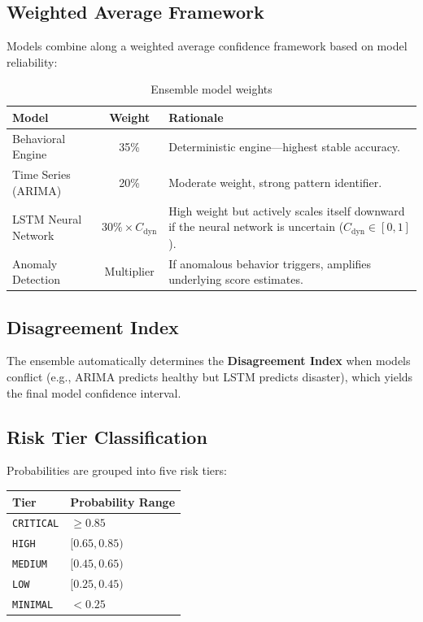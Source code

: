 \documentclass[12pt, a4paper, oneside]{report}
\begin{document}
\subsection{Weighted Average Framework}

Models combine along a weighted average confidence framework based on model reliability:

\begin{table}[H]
\centering
\caption{Ensemble model weights}
\label{tab:weights}
\begin{tabular}{@{} l c p{6.5cm} @{}}
\toprule
\textbf{Model} & \textbf{Weight} & \textbf{Rationale} \\
\midrule
Behavioral Engine     & 35\% & Deterministic engine---highest stable accuracy. \\[3pt]
Time Series (ARIMA)   & 20\% & Moderate weight, strong pattern identifier. \\[3pt]
LSTM Neural Network   & $30\% \times C_{\text{dyn}}$ & High weight but actively scales itself downward if the neural network is uncertain ($C_{\text{dyn}} \in [0,1]$). \\[3pt]
Anomaly Detection     & Multiplier & If anomalous behavior triggers, amplifies underlying score estimates. \\
\bottomrule
\end{tabular}
\end{table}

\subsection{Disagreement Index}

The ensemble automatically determines the \textbf{Disagreement Index} when models conflict (e.g., ARIMA predicts healthy but LSTM predicts disaster), which yields the final model confidence interval.

\subsection{Risk Tier Classification}

Probabilities are grouped into five risk tiers:

\begin{center}
\begin{tabular}{@{} l l @{}}
\toprule
\textbf{Tier} & \textbf{Probability Range} \\
\midrule
\texttt{CRITICAL} & $\geq 0.85$ \\
\texttt{HIGH}     & $[0.65, 0.85)$ \\
\texttt{MEDIUM}   & $[0.45, 0.65)$ \\
\texttt{LOW}      & $[0.25, 0.45)$ \\
\texttt{MINIMAL}  & $< 0.25$ \\
\bottomrule
\end{tabular}
\end{center}
\end{document}
